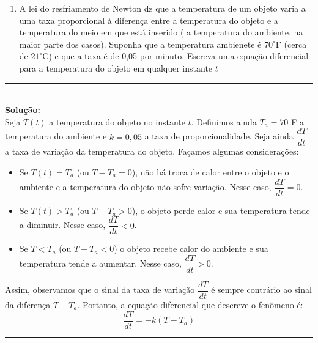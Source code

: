 \documentclass[twoside]{article}
\newcommand{\iniSol}{
    \noindent\textcolor{mainColor}{\rule{0.3\textwidth}{0.4pt}}\\
    \noindent\textcolor{mainColor}{\textbf{Solução:}}\\
}
\newcommand{\fimSol}{
    \hfill\fcolorbox{mainColor}{mainColor}

    
    \hfill\textcolor{mainColor}{\rule{0.3\textwidth}{0.4pt}}
}
\begin{document}
\begin{enumerate}[resume]
  \item A lei do resfriamento de Newton dz que a temperatura de um objeto varia a uma taxa proporcional à diferença entre a temperatura do objeto e a temperatura do meio em que está inserido ( a temperatura do ambiente, na maior parte dos casos). Suponha que a temperatura ambienete é $70^\circ$F (cerca de $21^\circ$C) e que a taxa é de 0,05 por minuto. Escreva uma equação diferencial para a temperatura do objeto em qualquer instante $t$
\end{enumerate}

\iniSol

Seja \(T(t)\) a temperatura do objeto no instante \(t\). Definimos ainda \(T_a = 70^\circ\)F a temperatura do ambiente e \(k = 0,05\) a taxa de proporcionalidade. Seja ainda \(\dfrac{dT}{dt}\) a taxa de variação da temperatura do objeto. Façamos algumas considerações:

\begin{itemize}
    \item Se $T(t) = T_a$ (ou $T - T_a = 0$), não há troca de calor entre o objeto e o ambiente e a temperatura do objeto não sofre variação. Nesse caso, $\dfrac{dT}{dt} = 0$.
    \item Se $T(t) > T_a$ (ou $T - T_a > 0$), o objeto perde calor e sua temperatura tende a diminuir. Nesse caso, $\dfrac{dT}{dt} < 0$.
    \item Se $T < T_a$ (ou $T - T_a < 0$) o objeto recebe calor do ambiente e sua temperatura tende a aumentar. Nesse caso, $\dfrac{dT}{dt} > 0$.
  \end{itemize}

Assim, observamos que o sinal da taxa de variação \(\dfrac{dT}{dt}\) é sempre contrário ao sinal da diferença \(T - T_a\). Portanto, a equação diferencial que descreve o fenômeno é:
\[
  \dfrac{dT}{dt} = -k (T - T_a)
  \]
\fimSol
\end{document}
